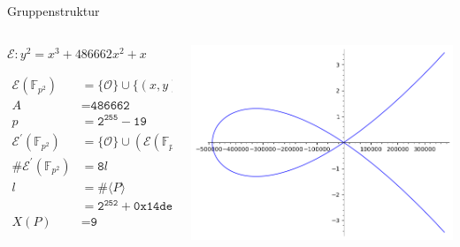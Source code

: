 \begin{frame}{Gruppenstruktur}
    \begin{columns}
        \begin{column}{0.66\textwidth}
            
            \begin{algorithmblock}
                \begin{center}
                    $\mathcal{E}:y^2=x^3+486662x^2+x$
                \end{center}
               
        
            \end{algorithmblock}
            \begin{align*}
                \mathcal{E}(\mathbb{F}_{p^2})&=\{\mathcal{O}\}\cup \{(x,y)\in \mathbb{F}_{p^2}:y^2=x^3+Ax^2+x\}\\
                A&=\texttt{486662}\\
                p&=\texttt{2}^{\texttt{255}}-\texttt{19}\\
                \mathcal{E}^\prime(\mathbb{F}_{p^2})&=\{\mathcal{O}\}\cup (\mathcal{E}(\mathbb{F}_{p^2})\cap (\mathbb{F}_p\times\mathbb{F}_p))\\
                \#\mathcal{E}^\prime(\mathbb{F}_{p^2})&=\texttt{8}l\\
                l&=\#\langle P\rangle\\
                &=\texttt{2}^{\texttt{252}} +\texttt{0x14def9dea2f79cd65812631a5cf5d3ed}\\
                X(P)&=\texttt{9}\\
            \end{align*}
        \end{column}
        
        \begin{column}{0.5\textwidth}
            \includegraphics[width=\linewidth]{img/curve25519.png}
        \end{column}
    \end{columns}
    
\end{frame}
